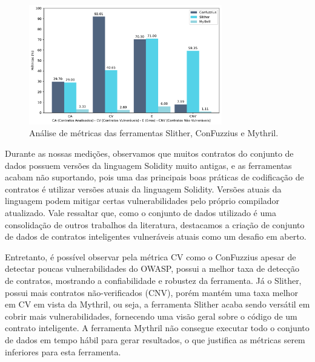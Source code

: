 \documentclass[12pt]{article}
\begin{document}
\begin{figure}[!ht]
    \centering
    \includegraphics[width=0.75\textwidth]{images/grafico_metricas.pdf} 
      \caption{Análise de métricas das ferramentas Slither, ConFuzzius e Mythril.}
    \label{fig:analisemetricas}
\end{figure}

Durante as nossas medições, observamos que muitos contratos do conjunto de dados possuem versões da linguagem Solidity muito antigas, e as ferramentas acabam não suportando, pois uma das principais boas práticas de codificação de contratos é utilizar versões atuais da linguagem Solidity. Versões atuais da linguagem podem mitigar certas vulnerabilidades pelo próprio compilador atualizado. Vale ressaltar que, como o conjunto de dados utilizado é uma consolidação de outros trabalhos da literatura, destacamos a criação de conjunto de dados de contratos inteligentes vulneráveis atuais como um desafio em aberto.

Entretanto, é possível observar pela métrica CV como o ConFuzzius apesar de detectar poucas vulnerabilidades do OWASP, possui a melhor taxa de detecção de contratos, mostrando a confiabilidade e robustez da ferramenta. Já o Slither, possui mais contratos não-verificados (CNV), porém mantém uma taxa melhor em CV em vista da Mythril, ou seja, a ferramenta Slither acaba sendo versátil em cobrir mais vulnerabilidades, fornecendo uma visão geral sobre o código de um contrato inteligente. A ferramenta Mythril não consegue executar todo o conjunto de dados em tempo hábil para gerar resultados, o que justifica as métricas serem inferiores para esta ferramenta.

\end{document}
